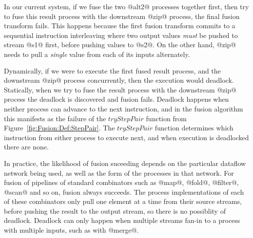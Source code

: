 In our current system, if we fuse the two @alt2@ processes together first, then try to fuse this result process with the downstream @zip@ process, the final fusion transform fails. This happens because the first fusion transform commits to a sequential instruction interleaving where two output values \emph{must} be pushed to stream @s1@ first, before pushing values to @s2@. On the other hand, @zip@ needs to pull a \emph{single} value from each of its inputs alternately.

Dynamically, if we were to execute the first fused result process, and the downstream @zip@ process concurrently, then the execution would deadlock. Statically, when we try to fuse the result process with the downstream @zip@ process the deadlock is discovered and fusion fails. Deadlock happens when neither process can advance to the next instruction, and in the fusion algorithm this manifests as the failure of the $tryStepPair$ function from Figure~\ref{fig:Fusion:Def:StepPair}. The $tryStepPair$ function determines which instruction from either process to execute next, and when execution is deadlocked there are none.




In practice, the likelihood of fusion suceeding depends on the particular dataflow network being used, as well as the form of the processes in that network. For fusion of pipelines of standard combinators such as @map@, @fold@, @filter@, @scan@ and so on, fusion always succeeds. The process implementations of each of these combinators only pull one element at a time from their source streams, before pushing the result to the output stream, so there is no possiblity of deadlock. Deadlock can only happen when multiple streams fan-in to a process with multiple inputs, such as with @merge@. 

